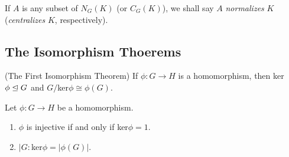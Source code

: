 \documentclass[../main]{subfiles}
\begin{document}
  
  \begin{dfn}
   If $A$ is any subset of $N_G(K)$ (or $C_G(K)$), we shall say $A$ \textit{normalizes} $K$ (\textit{centralizes} $K$, respectively).
  \end{dfn}
  
  
  \subsection{The Isomorphism Thoerems}
  
  
  \begin{thm}
   (The First Isomorphism Theorem) If $\phi \colon G\to H$ is a homomorphism, then ker$\phi \trianglelefteq G$ and $G/$ker$\phi \cong \phi(G)$.
  \end{thm}
  
  
  \begin{cor}
   Let $\phi \colon G\to H$ be a homomorphism.
   \begin{enumerate}
    \item $\phi$ is injective if and only if ker$\phi = 1$.
    \item $|G:$ker$\phi = |\phi(G)|$.
   \end{enumerate}
  \end{cor}
  
  
  \begin{thm}
   
  \end{thm}





  
\end{document}
